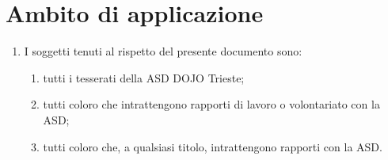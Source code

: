 \documentclass{djtsasddoc}
\begin{document}
	\section{Ambito di applicazione}
	\begin{enumerate}
		\item I soggetti tenuti al rispetto del presente documento sono:
		\begin{enumerate}
			\item tutti i tesserati della ASD DOJO Trieste;
			\item tutti coloro che intrattengono rapporti di lavoro o volontariato con la ASD;
			\item tutti coloro che, a qualsiasi titolo, intrattengono rapporti con la ASD.
		\end{enumerate}
	\end{enumerate}
	
\end{document}
